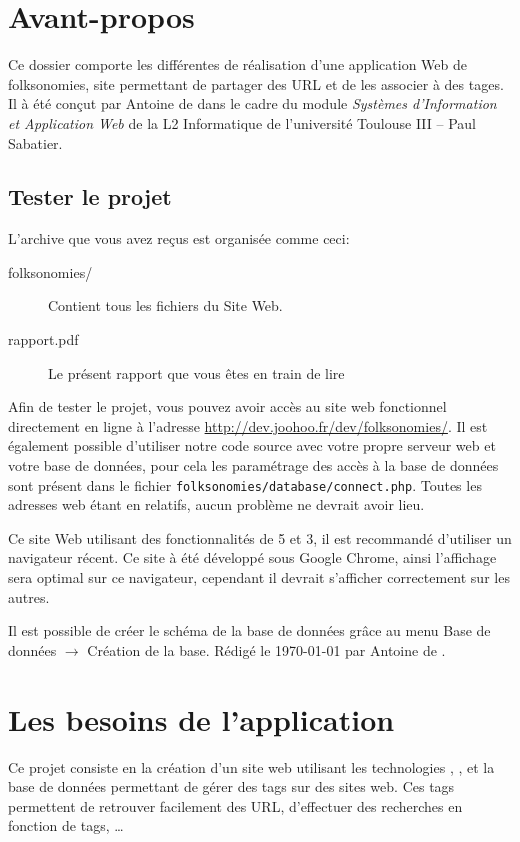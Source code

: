 \documentclass[12pt,a4paper,openany]{book}
\let\pagebreakORIG\pagebreak
\let\clearpageORIG\clearpage
\let\cleardoublepageORIG\cleardoublepage
\newcommand{\removepagebreak}{\renewcommand{\pagebreak}{}\renewcommand{\clearpage}{}\renewcommand{\cleardoublepage}{}}
\newcommand{\restorepagebreak}{\renewcommand{\pagebreak}{\pagebreakORIG}\renewcommand{\clearpage}{\clearpageORIG}\renewcommand{\cleardoublepage}{\cleardoublepageORIG}}
\begin{document}
	\setcounter{tocdepth}{2}
	\setcounter{secnumdepth}{3}
	\removepagebreak
	\maketitle
	\newpage
	\chapter*{Avant-propos}
	Ce dossier comporte les différentes de réalisation d'une application Web de folksonomies, site permettant de partager des URL et
	de les associer à des tages.  
	Il à été conçut par Antoine de  dans le cadre du module \textit{Systèmes d'Information et Application Web} de la L2 Informatique de l'université Toulouse III -- Paul Sabatier.

	\section*{Tester le projet}
	L'archive que vous avez reçus est organisée comme ceci: 
	\begin{description}
		\item[folksonomies/] Contient tous les fichiers du Site Web. 
		\item[rapport.pdf] Le présent rapport que vous êtes en train de lire
	\end{description}

	Afin de tester le projet, vous pouvez avoir accès au site web fonctionnel directement en ligne à l'adresse
	\url{http://dev.joohoo.fr/dev/folksonomies/}. 
	Il est également possible d'utiliser notre code source avec votre propre serveur web et votre base de données, pour cela les paramétrage des accès à la base de données 
	sont présent dans le fichier \texttt{folksonomies/database/connect.php}. Toutes les adresses web étant en relatifs, aucun problème ne devrait avoir lieu.

	Ce site Web utilisant des fonctionnalités de 5 et 3, il est recommandé d'utiliser un navigateur récent. Ce site à été développé sous
	Google Chrome, ainsi l'affichage sera optimal sur ce navigateur, cependant il devrait s'afficher correctement sur les autres.

	Il est possible de créer le schéma de la base de données grâce au menu Base de données $\rightarrow$ Création de la base.
	\vfill
	\footnotesize Rédigé le \today{} par Antoine de .
	\restorepagebreak
	\tableofcontents
	\chapter{Les besoins de l'application}
	Ce projet consiste en la création d'un site web utilisant les technologies , ,  et la base de données 
	permettant de gérer des tags sur des sites web. Ces tags permettent de retrouver facilement des URL, d'effectuer des recherches
	en fonction de tags, \ldots
\end{document}
